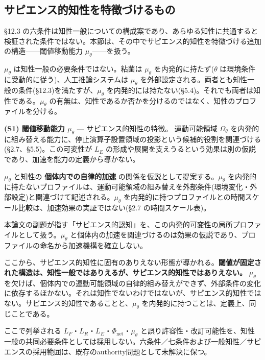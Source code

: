 \bigskip


\subsection{サピエンス的知性を特徴づけるもの}


\S{}12.3 の六条件は知性一般についての構成案であり、あらゆる知性に共通すると検証された条件ではない。本節は、その中でサピエンス的知性を特徴づける追加の構造——閾値移動能力 $\mu_\theta$——を扱う。

$\mu_\theta$ は知性一般の必要条件ではない。粘菌は $\mu_\theta$ を内発的に持たず($\theta$ は環境条件に受動的に従う)、人工推論システムは $\mu_\theta$ を外部設定される。両者とも知性一般の条件(\S{}12.3)を満たすが、$\mu_\theta$ を内発的には持たない(\S{}5.4)。それでも両者は知性である。$\mu_\theta$ の有無は、知性であるか否かを分けるのではなく、知性のプロファイルを分ける。

\textbf{(S1) 閾値移動能力 $\mu_\theta$} — サピエンス的知性の特徴。
運動可能領域 $\Omega_\theta$ を内発的に組み替える能力に、停止演算子設置領域の投影という候補的役割を関連づける(\S{}2.7、\S{}5.5)。この可変性が $L_E$ の形成や展開を支えうるという効果は別の仮説であり、加速を能力の定義から導かない。

$\mu_\theta$ と知性の \textbf{個体内での自律的加速} の関係を仮説として提案する。$\mu_\theta$ を内発的に持たないプロファイルは、運動可能領域の組み替えを外部条件(環境変化・外部設定)と関連づけて記述される。$\mu_\theta$ を内発的に持つプロファイルとの時間スケール比較は、加速効果の実証ではない(\S{}2.7 の時間スケール表)。

本論文の副題が指す「サピエンス的認知」を、この内発的可変性の局所プロファイルとして扱う。$\mu_\theta$ と個体内の加速を関連づけるのは効果の仮説であり、プロファイルの命名から加速機構を確立しない。

ここから、サピエンス的知性に固有のありえない形態が導かれる。\textbf{閾値が固定された構造は、知性一般ではありえるが、サピエンス的知性ではありえない。} $\mu_\theta$ を欠けば、個体内での運動可能領域の自律的組み替えができず、外部条件の変化に依存するほかない。それは知性でないわけではないが、サピエンス的知性ではない。サピエンス的知性であることと、$\mu_\theta$ を内発的に持つことは、定義上、同じことである。

ここで列挙される $L_F$・$L_R$・$L_E$・$\Phi_{\text{net}}$・$\mu_\theta$ と誤り許容性・改訂可能性を、知性一般の共同必要条件としては採用しない。六条件／七条件および一般知性／サピエンスの採用範囲は、既存のauthority問題として未解決に保つ。

\bigskip


